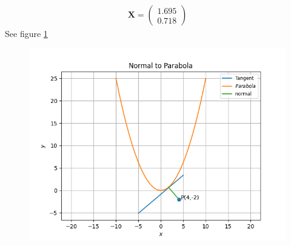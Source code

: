 \documentclass[12pt]{article}
\newcommand{\myvec}[1]{\ensuremath{\begin{pmatrix}#1\end{pmatrix}}}
\let\vec\mathbf
\begin{document}
\begin{align}
	\vec{X} = \myvec{1.695\\0.718}
\end{align}
See figure \ref{fig:Fig1}
\begin{figure}[!h]
	\begin{center} 
	    \includegraphics[width=\columnwidth]{figs/12_6_6_4}
	\end{center}
\caption{}
\label{fig:Fig1}
\end{figure}
\end{document}
